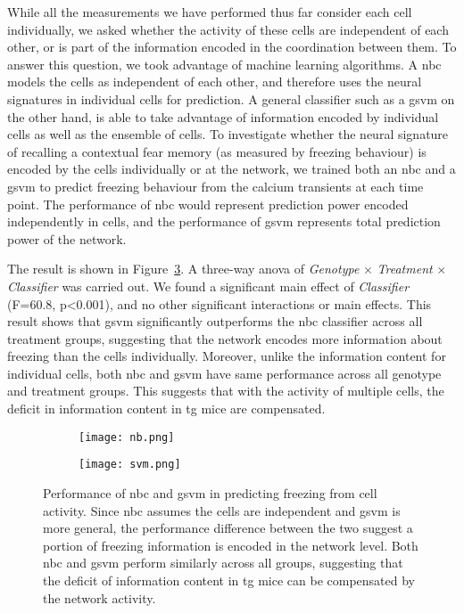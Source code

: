 While all the measurements we have performed thus far consider each cell individually, we asked whether the activity of these cells are independent of each other, or is part of the information encoded in the coordination between them. To answer this question, we took advantage of machine learning algorithms. A \gls{nbc} models the cells as independent of each other, and therefore uses the neural signatures in individual cells for prediction. A general classifier such as a \gls{gsvm} on the other hand, is able to take advantage of information encoded by individual cells as well as the ensemble of cells. To investigate whether the neural signature of recalling a contextual fear memory (as measured by freezing behaviour) is encoded by the cells individually or at the network, we trained both an \gls{nbc} and a \gls{gsvm} to predict freezing behaviour from the calcium transients at each time point. The performance of \gls{nbc} would represent prediction power encoded independently in cells, and the performance of \gls{gsvm} represents total prediction power of the network.

The result is shown in Figure~\ref{f.ad.classifier}. A three-way \gls{anova} of \textit{Genotype} $\times$ \textit{Treatment} $\times$ \textit{Classifier} was carried out. We found a significant main effect of \textit{Classifier} (F=60.8, p<0.001), and no other significant interactions or main effects. This result shows that \gls{gsvm} significantly outperforms the \gls{nbc} classifier across all treatment groups, suggesting that the network encodes more information about freezing than the cells individually. Moreover, unlike the information content for individual cells, both \gls{nbc} and \gls{gsvm} have same performance across all genotype and treatment groups. This suggests that with the activity of multiple cells, the deficit in information content in \gls{tg} mice are compensated. 

\begin{figure}[h]
    \begin{subfigure}[h]{\textwidth}
        \texttt{[image: nb.png]}
        \caption{\label{f.ad.nb}}
    \end{subfigure}
    \begin{subfigure}[h]{\textwidth}
        \texttt{[image: svm.png]}
        \caption{\label{f.ad.svm}}
    \end{subfigure}
    \caption[Accuracy of machine learning classifier in predicting freezing.]{Performance of  \gls{nbc} and  \gls{gsvm} in predicting freezing from cell activity. Since \gls{nbc} assumes the cells are independent and \gls{gsvm} is more general, the performance difference between the two suggest a portion of freezing information is encoded in the network level. Both \gls{nbc} and \gls{gsvm} perform similarly across all groups, suggesting that the deficit of information content in \gls{tg} mice can be compensated by the network activity. \label{f.ad.classifier}}
\end{figure}

